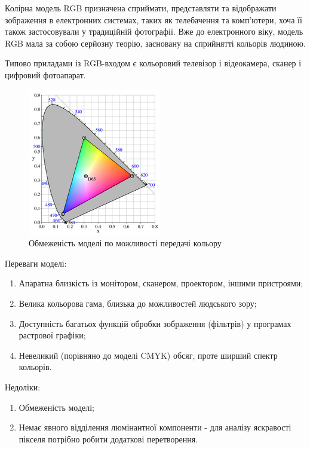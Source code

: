 Колірна модель RGB призначена сприймати, представляти та відображати зображення в електронних системах, таких як телебачення та комп'ютери, хоча її також застосовували у традиційній фотографії. Вже до електронного віку, модель RGB мала за собою серйозну теорію, засновану на сприйнятті кольорів людиною.

Типово приладами із RGB-входом є кольоровий телевізор і відеокамера, сканер і цифровий фотоапарат.

\begin{figure}[H]
	\centering
	\includegraphics[width=0.7\linewidth]{theory/img/rgb_limitations}
	\caption{Обмеженість моделі по можливості передачі кольору}
\end{figure}

Переваги моделі:
\begin{enumerate}
	\item Апаратна близкість із монітором, сканером, проектором, іншими пристроями;
	\item Велика кольорова гама, близька до можливостей людського зору;
	\item Доступність багатьох функцій обробки зображення (фільтрів) у програмах растрової графіки;
	\item Невеликий (порівняно до моделі CMYK) обсяг, проте ширший спектр кольорів.
\end{enumerate}
\bigbreak
Недоліки:
\begin{enumerate}
	\item Обмеженість моделі;
	\item Немає явного відділення люмінантної компоненти - для аналізу яскравості пікселя потрібно робити додаткові перетворення.
\end{enumerate}

